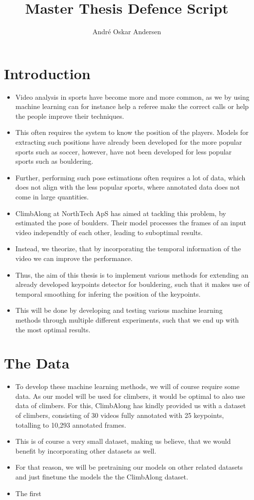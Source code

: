 \documentclass[a4paper]{report}
\title{Master Thesis Defence Script}
\author{André Oskar Andersen}
\date{}
\begin{document}
    
\maketitle

\section{Introduction}
\begin{itemize}
    \item Video analysis in sports have become more and more common, as we by using machine learning can for instance help a referee make the correct calls or help the people improve their techniques.
    \item This often requires the system to know the position of the players. Models for extracting such positions have already been developed for the more popular sports such as soccer, however, have not been developed for less popular sports such as bouldering.
    \item Further, performing such pose estimations often requires a lot of data, which does not align with the less popular sports, where annotated data does not come in large quantities.
    \item ClimbAlong at NorthTech ApS has aimed at tackling this problem, by estimated the pose of boulders. Their model processes the frames of an input video independtly of each other, leading to suboptimal results.
    \item Instead, we theorize, that by incorporating the temporal information of the video we can improve the performance.
    \item Thus, the aim of this thesis is to implement various methods for extending an already developed keypoints detector for bouldering, such that it makes use of temporal smoothing for infering the position of the keypoints.
    \item This will be done by developing and testing various machine learning methods through multiple different experiments, such that we end up with the most optimal results.
\end{itemize}

\section{The Data}
\begin{itemize}
    \item To develop these machine learning methods, we will of course require some data. As our model will be used for climbers, it would be optimal to also use data of climbers. For this, ClimbAlong has kindly provided us with a dataset of climbers, consisting of 30 videos fully annotated with 25 keypoints, totalling to 10,293 annotated frames.
    \item This is of course a very small dataset, making us believe, that we would benefit by incorporating other datasets as well.
    \item For that reason, we will be pretraining our models on other related datasets and just finetune the models the the ClimbAlong dataset.
    \item The first 
\end{itemize}
\end{document}
